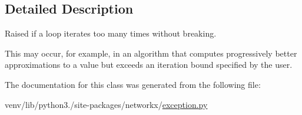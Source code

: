 \subsection{Detailed Description}
\begin{DoxyVerb}Raised if a loop iterates too many times without breaking.

This may occur, for example, in an algorithm that computes
progressively better approximations to a value but exceeds an
iteration bound specified by the user.\end{DoxyVerb}
 

The documentation for this class was generated from the following file\+:\begin{DoxyCompactItemize}
\item 
venv/lib/python3./site-\/packages/networkx/\hyperlink{exception_8py}{exception.\+py}\end{DoxyCompactItemize}
